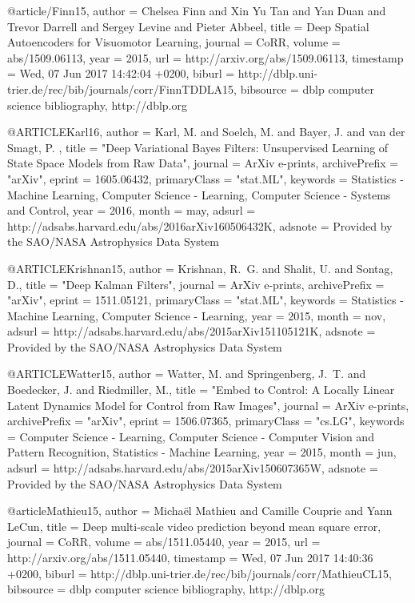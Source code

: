 @article{/Finn15,
  author    = {Chelsea Finn and
               Xin Yu Tan and
               Yan Duan and
               Trevor Darrell and
               Sergey Levine and
               Pieter Abbeel},
  title     = {Deep Spatial Autoencoders for Visuomotor Learning},
  journal   = {CoRR},
  volume    = {abs/1509.06113},
  year      = {2015},
  url       = {http://arxiv.org/abs/1509.06113},
  timestamp = {Wed, 07 Jun 2017 14:42:04 +0200},
  biburl    = {http://dblp.uni-trier.de/rec/bib/journals/corr/FinnTDDLA15},
  bibsource = {dblp computer science bibliography, http://dblp.org}
}


@ARTICLE{Karl16,
   author = {{Karl}, M. and {Soelch}, M. and {Bayer}, J. and {van der Smagt}, P.
	},
    title = "{Deep Variational Bayes Filters: Unsupervised Learning of State Space Models from Raw Data}",
  journal = {ArXiv e-prints},
archivePrefix = "arXiv",
   eprint = {1605.06432},
 primaryClass = "stat.ML",
 keywords = {Statistics - Machine Learning, Computer Science - Learning, Computer Science - Systems and Control},
     year = 2016,
    month = may,
   adsurl = {http://adsabs.harvard.edu/abs/2016arXiv160506432K},
  adsnote = {Provided by the SAO/NASA Astrophysics Data System}
}

@ARTICLE{Krishnan15,
   author = {{Krishnan}, R.~G. and {Shalit}, U. and {Sontag}, D.},
    title = "{Deep Kalman Filters}",
  journal = {ArXiv e-prints},
archivePrefix = "arXiv",
   eprint = {1511.05121},
 primaryClass = "stat.ML",
 keywords = {Statistics - Machine Learning, Computer Science - Learning},
     year = 2015,
    month = nov,
   adsurl = {http://adsabs.harvard.edu/abs/2015arXiv151105121K},
  adsnote = {Provided by the SAO/NASA Astrophysics Data System}
}

@ARTICLE{Watter15,
   author = {{Watter}, M. and {Springenberg}, J.~T. and {Boedecker}, J. and 
	{Riedmiller}, M.},
    title = "{Embed to Control: A Locally Linear Latent Dynamics Model for Control from Raw Images}",
  journal = {ArXiv e-prints},
archivePrefix = "arXiv",
   eprint = {1506.07365},
 primaryClass = "cs.LG",
 keywords = {Computer Science - Learning, Computer Science - Computer Vision and Pattern Recognition, Statistics - Machine Learning},
     year = 2015,
    month = jun,
   adsurl = {http://adsabs.harvard.edu/abs/2015arXiv150607365W},
  adsnote = {Provided by the SAO/NASA Astrophysics Data System}
}

@article{Mathieu15,
	author    = {Micha{\"{e}}l Mathieu and
		Camille Couprie and
		Yann LeCun},
	title     = {Deep multi-scale video prediction beyond mean square error},
	journal   = {CoRR},
	volume    = {abs/1511.05440},
	year      = {2015},
	url       = {http://arxiv.org/abs/1511.05440},
	timestamp = {Wed, 07 Jun 2017 14:40:36 +0200},
	biburl    = {http://dblp.uni-trier.de/rec/bib/journals/corr/MathieuCL15},
	bibsource = {dblp computer science bibliography, http://dblp.org}
}
